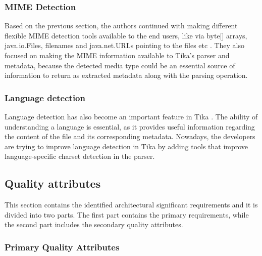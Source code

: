 \documentclass{article}
\begin{document}
\subsubsection{MIME Detection}
Based on the previous section, the authors continued with making different flexible MIME detection tools available to the end users, like via byte[] arrays, java.io.Files, filenames and java.net.URLs pointing to the files etc \citep{tika_in_action}. They  also focused on making the MIME information available to Tika’s parser and metadata, because the detected media type could be an essential source of information to return as extracted metadata along with the parsing operation.

\subsubsection{Language detection}
Language detection has also become an important feature in Tika \citep{tika_in_action}. The ability of understanding a language is essential, as it provides useful information regarding the content of the file and its corresponding metadata. Nowadays, the developers are trying to improve language detection in Tika by adding tools that improve language-specific charset detection in the parser.

\subsection{Quality attributes}
This section contains the identified architectural significant requirements and it is divided into two parts. The first part contains the primary requirements, while the second part includes the secondary quality attributes.

\subsubsection{Primary Quality Attributes}
\end{document}

